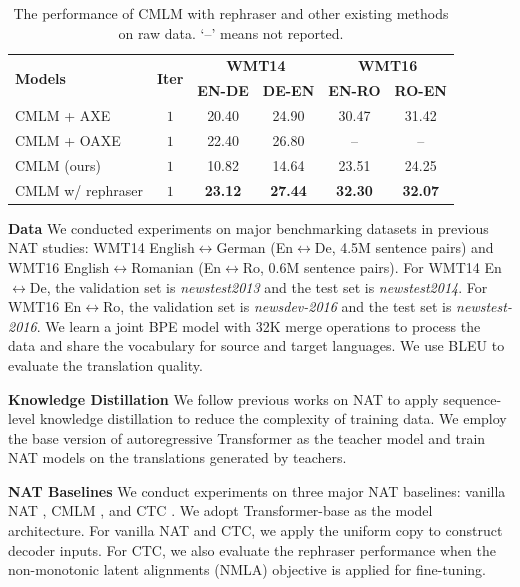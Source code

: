 \documentclass[letterpaper]{article} %
\begin{document}
\begin{table}[h]
\centering
\small
\begin{tabular}{lccccc}
\toprule
 \multirow{2}{*}{\textbf{Models}} & \multirow{2}{*}{\textbf{Iter}} &
 \multicolumn{2}{c}{\textbf{WMT14}} & \multicolumn{2}{c}{\textbf{WMT16}} \\
  &&\textbf{EN-DE} & \textbf{DE-EN} & \textbf{EN-RO} & \textbf{RO-EN} \\
\midrule
CMLM + AXE \cite{Aligned} &$1$& 20.40 & 24.90 & 30.47 & 31.42 \\
CMLM + OAXE \cite{DBLP:conf/icml/DuTJ21} &$1$&22.40 & 26.80 & -- & --\\
CMLM (ours) &$1$& 10.82& 14.64&23.51 &24.25 \\
CMLM w/ rephraser &$1$&\bf{23.12} &\bf{27.44}& \bf{32.30}&\bf{32.07} \\
\bottomrule
\end{tabular}
\caption{The performance of CMLM with rephraser and other existing methods on raw data. `--' means not reported.}
\label{tab:raw}
\end{table}
\noindent{}\textbf{Data} We conducted experiments on major benchmarking datasets in previous NAT studies: WMT14 English$\leftrightarrow$German (En$\leftrightarrow$De, 4.5M sentence pairs) and WMT16 English$\leftrightarrow$Romanian (En$\leftrightarrow$Ro, 0.6M sentence pairs). For WMT14 En$\leftrightarrow$De, the validation set is \textit{newstest2013} and the test set is \textit{newstest2014}. For WMT16 En$\leftrightarrow$Ro, the validation set is \textit{newsdev-2016} and the test set is \textit{newstest-2016}. We learn a joint BPE model \cite{sennrich2015neural} with 32K merge operations to process the data and share the vocabulary for source and target languages. We use BLEU \cite{papineni2002bleu} to evaluate the translation quality.

\noindent{}\textbf{Knowledge Distillation} We follow previous works on NAT to apply sequence-level knowledge distillation \cite{kim-rush-2016-sequence} to reduce the complexity of training data. We employ the base version of autoregressive Transformer \cite{vaswani2017attention} as the teacher model and train NAT models on the translations generated by teachers.

\noindent{}\textbf{NAT Baselines} We conduct experiments on three major NAT baselines: vanilla NAT \cite{gu2017non}, CMLM \cite{ghazvininejad2019maskpredict}, and CTC \cite{libovicky2018end}. We adopt Transformer-base as the model architecture. For vanilla NAT and CTC, we apply the uniform copy \cite{gu2017non} to construct decoder inputs. For CTC, we also evaluate the rephraser performance when the non-monotonic latent alignments (NMLA) objective \cite{nmla} is applied for fine-tuning.
\end{document}
